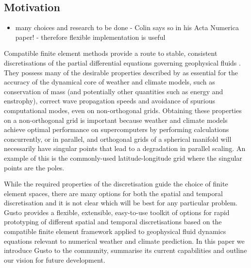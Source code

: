 \documentclass[journal abbreviation, manuscript]{copernicus}
\begin{document}
\introduction   %

\subsection{Motivation}
\begin{itemize}
\item many choices and research to be done - Colin says so in his Acta Numerica paper! - therefore flexible implementation is useful
\end{itemize}

Compatible finite element methods provide a route to stable,
consistent discretisations of the partial differential equations
governing geophysical fluids \citep{cotter2023compatible}. They
possess many of the desirable properties described by
\citet{staniforth2012horizontal} as essential for the accuracy of the
dynamical core of weather and climate models, such as conservation of
mass (and potentially other quantities such as energy and enstrophy),
correct wave propagation speeds and avoidance of spurious
computational modes, even on non-orthogonal grids. Obtaining these
properties on a non-orthogonal grid is important because weather and
climate models achieve optimal performance on supercomputers by
performing calculations concurrently, or in parallel, and orthogonal
grids of a spherical manifold will necessarily have singular points
that lead to a degradation in parallel scaling. An example of this is
the commonly-used latitude-longitude grid where the singular points
are the poles.


While the required properties of the discretisation guide the choice
of finite element spaces, there are many options for both the spatial
and temporal discretisation and it is not clear which will be best for
any particular problem. Gusto provides a flexible, extensible,
easy-to-use toolkit of options for rapid prototyping of different
spatial and temporal discretisations based on the compatible finite
element framework applied to geophysical fluid dynamics equations
relevant to numerical weather and climate prediction. In this paper we
introduce Gusto to the community, summarise its current capabilities
and outline our vision for future development.
\end{document}
